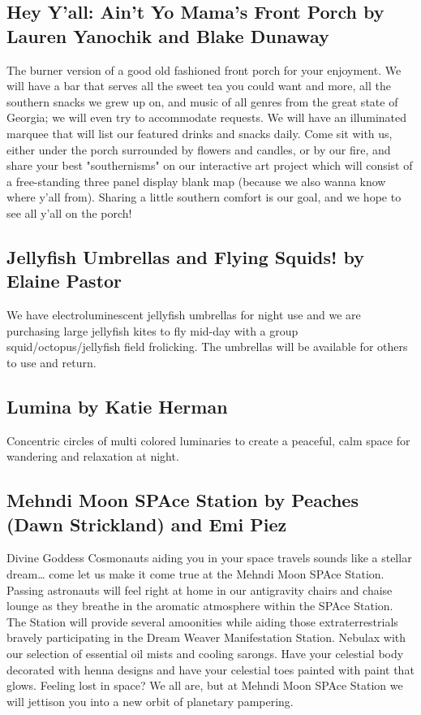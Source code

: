 \begin{multicols}{2}
\subsection*{Hey Y'all: Ain't Yo Mama's Front Porch by Lauren Yanochik and Blake Dunaway                }
The burner version of a good old fashioned front porch for your enjoyment. We will have a bar that serves all the sweet tea you could want and more, all the southern snacks we grew up on, and music of all genres from the great state of Georgia; we will even try to accommodate requests. We will have an illuminated marquee that will list our featured drinks and snacks daily. Come sit with us, either under the porch surrounded by flowers and candles, or by our fire, and share your best "southernisms" on our interactive art project which will consist of a free-standing three panel display blank map (because we also wanna know where y'all from). Sharing a little southern comfort is our goal, and we hope to see all y'all on the porch!


\subsection*{Jellyfish Umbrellas and Flying Squids!        by Elaine Pastor                }
We have electroluminescent jellyfish umbrellas for night use and we are purchasing large jellyfish kites to fly mid-day with a group squid/octopus/jellyfish field frolicking. The umbrellas will be available for others to use and return.        


\subsection*{Lumina by Katie Herman                }
Concentric circles of multi colored luminaries to create a peaceful, calm space for wandering and relaxation at night.


\subsection*{Mehndi Moon SPAce Station by Peaches (Dawn Strickland) and Emi Piez                        }
Divine Goddess Cosmonauts aiding you in your space travels sounds like a stellar dream… come let us make it come true at the Mehndi Moon SPAce Station. Passing astronauts will feel right at home in our antigravity chairs and chaise lounge as they breathe in the aromatic atmosphere within the SPAce Station. The Station will provide several amoonities while aiding those extraterrestrials bravely participating in the Dream Weaver Manifestation Station. Nebulax with our selection of essential oil mists and cooling sarongs. Have your celestial body decorated with henna designs and have your celestial toes painted with paint that glows. Feeling lost in space? We all are, but at Mehndi Moon SPAce Station we will jettison you into a new orbit of planetary pampering.



\end{multicols}
